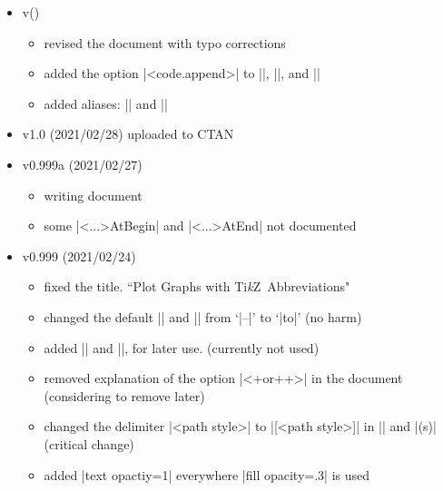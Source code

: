 \documentclass[a4paper,amsmath,chapter]{oblivoir}
\newcommand*\Tikz{Ti\textit{k}Z}
\begin{document}
\begin{itemize}
\item v\tmpversion (\tmpdate)
  \begin{itemize}
  \item revised the document with typo corrections
  \item added the option |<code.append>| to |\tzframe|, |\tzcircle|, and |\tzellipse|
  \item added aliases: |\let\tzrectangle\tzframe| and |\let\tzoval\tzellipse|
  \end{itemize}
\item v1.0 (2021/02/28) uploaded to CTAN
\item v0.999a (2021/02/27)
  \begin{itemize}
  \item writing document
  \item some |\tz<...>AtBegin| and |\tz<...>AtEnd| not documented
  \end{itemize}
\item v0.999 (2021/02/24)
  \begin{itemize}
  \item fixed the title. ``Plot Graphs with \Tikz\ Abbreviations"
  \item changed the default |\tzpathstyle| and |\tzlinkstyle| from `|--|' to `|to|' (no harm)
  \item added |\tzpathlayer| and |\settzpathlayer|, for later use. (currently not used)
  \item removed explanation of the option |<+or++>| in the document (considering to remove later)
  \item changed the delimiter |<path style>| to |[<path style>]| in |\tzpath| and |\tzlink(s)| (critical change)
  \item added |text opactiy=1| everywhere |fill opacity=.3| is used
  \end{itemize}

\end{itemize}
\end{document}
